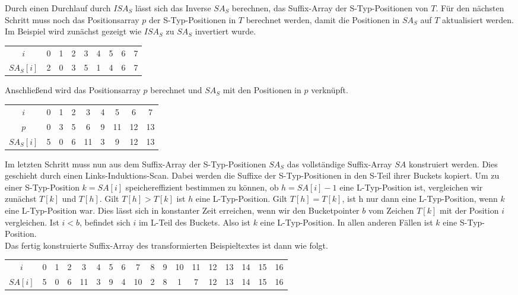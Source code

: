 Durch einen Durchlauf durch $ISA_S$ lässt sich das Inverse $SA_S$ berechnen, das Suffix-Array der S-Typ-Positionen von $T$. Für den nächsten Schritt muss noch das Positionsarray $p$ der S-Typ-Positionen in $T$ berechnet werden, damit die Positionen in $SA_S$ auf $T$ aktualisiert werden. \\
Im Beispiel wird zunächst gezeigt wie $ISA_S$ zu $SA_S$ invertiert wurde.

\begin{table}[H]
	\footnotesize
	\centering
	\begin{tabular}{c| c c c c c c c c }
		$i$ & 0 & 1 & 2 & 3 & 4 & 5 & 6 & 7\\
		$SA_S[i]$ & 2 & 0 & 3 & 5 & 1 & 4 & 6 & 7 
	\end{tabular}
\end{table}

Anschließend wird das Positionsarray $p$ berechnet und $SA_S$ mit den Positionen in $p$ verknüpft. 

\begin{table}[H]
	\footnotesize
	\centering
	\begin{tabular}{c| c c c c c c c c }
		$i$ & 0 & 1 & 2 & 3 & 4 & 5 & 6 & 7\\
		$p$ & 0 & 3 & 5 & 6 & 9 & 11 & 12 & 13\\
		$SA_S[i]$ & 5 & 0 & 6 & 11 & 3 & 9 & 12 & 13 
	\end{tabular}
\end{table}

Im letzten Schritt muss nun aus dem Suffix-Array der S-Typ-Positionen $SA_S$ das vollständige Suffix-Array $SA$ konstruiert werden. Dies geschieht durch einen Links-Induktions-Scan. Dabei werden die Suffixe der S-Typ-Positionen in den S-Teil ihrer Buckets kopiert. Um zu einer S-Typ-Position $k=SA[i]$ speichereffizient bestimmen zu können, ob $h=SA[i]-1$ eine L-Typ-Position ist, vergleichen wir zunächst $T[k]$ und $T[h]$. Gilt $T[h] > T[k]$ ist $h$ eine L-Typ-Position. Gilt $T[h] = T[k]$, ist h nur dann eine L-Typ-Position, wenn $k$ eine L-Typ-Position war. Dies lässt sich in konstanter Zeit erreichen, wenn wir den Bucketpointer $b$ vom Zeichen $T[k]$ mit der Position $i$ vergleichen. Ist $i < b$, befindet sich $i$ im L-Teil des Buckets. Also ist $k$ eine L-Typ-Position. In allen anderen Fällen ist $k$ eine S-Typ-Position. \\
Das fertig konstruierte Suffix-Array des transformierten Beispieltextes ist dann wie folgt. 

\begin{table}[H]
	\footnotesize
	\centering
	\begin{tabular}{c| c c c c c c c c c c c c c c c c c}
		$i$ & 0 & 1 & 2 & 3 & 4 & 5 & 6 & 7 & 8 & 9 & 10 & 11 & 12 & 13 & 14 & 15 & 16 \\
		$SA[i]$ & 5 & 0 & 6 & 11 & 3 & 9 & 4 & 10 & 2 & 8 & 1 & 7 & 12 & 13 & 14 & 15 & 16 
	\end{tabular}
\end{table}

